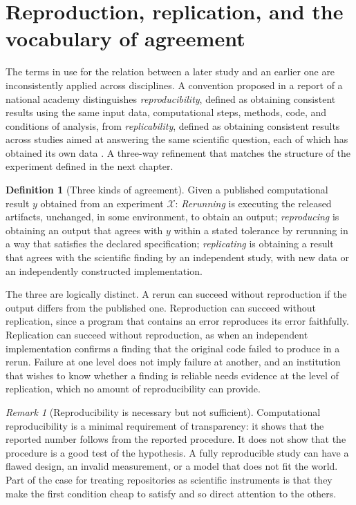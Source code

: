 \documentclass[11pt,twoside,openright]{book}
\theoremstyle{plain}
\theoremstyle{definition}
\newtheorem{definition}[theorem]{Definition}
\theoremstyle{remark}
\newtheorem{remark}[theorem]{Remark}
\begin{document}
\section{Reproduction, replication, and the vocabulary of agreement}

The terms in use for the relation between a later study and an earlier one are inconsistently applied across disciplines. A convention proposed in a report of a national academy distinguishes \emph{reproducibility}, defined as obtaining consistent results using the same input data, computational steps, methods, code, and conditions of analysis, from \emph{replicability}, defined as obtaining consistent results across studies aimed at answering the same scientific question, each of which has obtained its own data \cite{nasem2019}. A three-way refinement that matches the structure of the experiment defined in the next chapter.

\begin{definition}[Three kinds of agreement]\label{def:threeagree}
Given a published computational result $y$ obtained from an experiment $\mathcal{X}$:
\emph{Rerunning} is executing the released artifacts, unchanged, in some environment, to obtain an output;
\emph{reproducing} is obtaining an output that agrees with $y$ within a stated tolerance by rerunning in a way that satisfies the declared specification;
\emph{replicating} is obtaining a result that agrees with the scientific finding by an independent study, with new data or an independently constructed implementation.
\end{definition}

The three are logically distinct. A rerun can succeed without reproduction if the output differs from the published one. Reproduction can succeed without replication, since a program that contains an error reproduces its error faithfully. Replication can succeed without reproduction, as when an independent implementation confirms a finding that the original code failed to produce in a rerun. Failure at one level does not imply failure at another, and an institution that wishes to know whether a finding is reliable needs evidence at the level of replication, which no amount of reproducibility can provide.

\begin{remark}[Reproducibility is necessary but not sufficient]
Computational reproducibility is a minimal requirement of transparency: it shows that the reported number follows from the reported procedure. It does not show that the procedure is a good test of the hypothesis. A fully reproducible study can have a flawed design, an invalid measurement, or a model that does not fit the world. Part of the case for treating repositories as scientific instruments is that they make the first condition cheap to satisfy and so direct attention to the others.
\end{remark}
\end{document}
